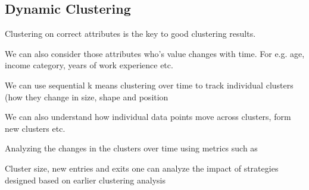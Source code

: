 	\subsection{Dynamic Clustering}
	\begin{bulletedlist}
		\item Clustering on correct attributes is the key to good clustering results.
		\item We can also consider those attributes who's value changes with time. For e.g. age, income category, years of work experience etc.
		\item We can use sequential k means clustering over time to track individual clusters (how they change in size, shape and position
		\item We can also understand how individual data points move across clusters, form new clusters etc.
		\item Analyzing the changes in the clusters over time using metrics such as
		\item Cluster size, new entries and exits one can analyze the impact of strategies designed based on earlier clustering analysis
	\end{bulletedlist}
